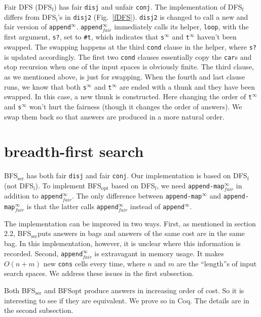 \documentclass[format=acmlarge, review=true, authordraft=true]{acmart}
\newcommand{\conj}{\texttt{conj}}
\newcommand{\disj}{\texttt{disj}}
\newcommand{\DFSi }[0]{DFS$_\textrm{i}$}
\newcommand{\DFSf }[0]{DFS$_\textrm{f}$}
\newcommand{\BFSopt}[0]{BFS$_\textrm{opt}$}
\newcommand{\BFSser}[0]{BFS$_\textrm{ser}$}
\begin{document}
Fair DFS (\DFSf) has fair \disj{} and unfair \conj{}. The 
implementation of \DFSf{} differs from \DFSi{}'s in 
\texttt{disj2} (Fig.~\ref{fDFS}). \texttt{disj2} is changed to call a new and 
fair version of \texttt{append$^\infty$}. \texttt{append$^\infty_{fair}$} 
immediately 
calls 
its helper, \texttt{loop}, with the first argument, \texttt{s?}, set to 
\texttt{\#{}t}, which indicates that 
\texttt{s$^\infty$} and \texttt{t$^\infty$} haven't been swapped. The swapping 
happens at 
the third \texttt{cond} clause in the helper, where \texttt{s?} is updated 
accordingly. The first two \texttt{cond} clauses essentially copy the 
\texttt{car}s and stop recursion when one of the input spaces is obviously 
finite. The third clause, as we mentioned above, is just for swapping. When the 
fourth and last clause runs, we know that both \texttt{s$^\infty$} and 
\texttt{t$^\infty$} are ended with a thunk and they have been swapped. In this 
case, a new thunk is constructed. Here changing the order of 
\texttt{t$^\infty$} and \texttt{s$^\infty$} won't hurt the fairness (though it 
changes the order of answers). We swap them back so that answers are 
produced in a more natural order.


\section{breadth-first search}

\BFSser{} has both fair \disj{} and fair \conj{}. Our implementation is based on 
DFS$_\textrm{f}$ (not DFS$_\textrm{i}$). To implement \BFSopt{} based on \DFSf{}, 
we need \texttt{append-map$^\infty_{fair}$} in addition to 
\texttt{append$^\infty_{fair}$}. 
The only difference between \texttt{append-map$^\infty$} and 
\texttt{append-map$^\infty_{fair}$} is that the latter calls 
\texttt{append$^\infty_{fair}$} instead of \texttt{append$^\infty$}.

The implementation can be improved in two ways. First, as mentioned in 
section 2.2, \BFSser puts answers in bags and answers of the same cost are in the 
same bag. In this implementation, however, it is unclear where this information 
is recorded. Second, \texttt{append$^\infty_{fair}$} is extravagant in memory 
usage. It 
makes $O(n+m)$ new \texttt{cons} cells every time, where $n$ and $m$ are the 
``length''s of input search spaces. We address these issues in the first 
subsection.

Both \BFSser{} \citet{seres1999algebra} and BFSopt{} produce answers in 
increasing order of cost. So it is interesting to see if they are equivalent. 
We prove so in Coq. The details are in the second subsection.
\end{document}
